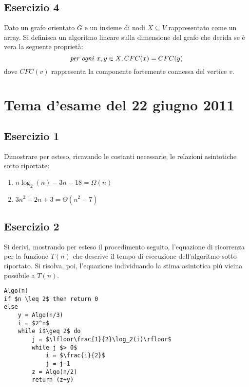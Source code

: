 \documentclass[11pt,a4paper,oneside]{article}
\begin{document}
\subsection*{Esercizio 4} Dato un grafo orientato $G$ e un insieme di nodi $X \subseteq V$ rappresentato come un array. Si definisca un algoritmo lineare sulla dimensione del grafo che decida se è vera la seguente proprietà: $$\text{\textit{per ogni }} x,y \in X, CFC(x) = CFC(y)$$ dove $CFC(v)$ rappresenta la componente fortemente connessa del vertice $v$.
\pagebreak
%
%
\section*{Tema d'esame del 22 giugno 2011}
\subsection*{Esercizio 1} Dimostrare per esteso, ricavando le costanti necessarie, le relazioni asintotiche sotto riportate:
\begin{enumerate}
	\item $n\log_2(n)-3n-18 = \Omega(n)$
	\item $3n^2+2n+3 = \Theta(n^2-7)$
\end{enumerate}
\subsection*{Esercizio 2} Si derivi, mostrando per esteso il procedimento seguito, l'equazione di ricorrenza per la funzione $T(n)$ che descrive il tempo di esecuzione dell'algoritmo sotto riportato. Si risolva, poi, l'equazione individuando la stima asintotica più vicina possibile a $T(n)$.

\begin{lstlisting}[mathescape=true]
Algo(n)
if $n \leq 2$ then return 0
else
	y = Algo(n/3)
	i = $2^n$
	while i$\geq 2$ do
		j = $\lfloor\frac{1}{2}\log_2(i)\rfloor$
		while j $> 0$
			i = $\frac{i}{2}$
			j = j-1
		z = Algo(n/2)
		return (z+y)
\end{lstlisting}
\end{document}
